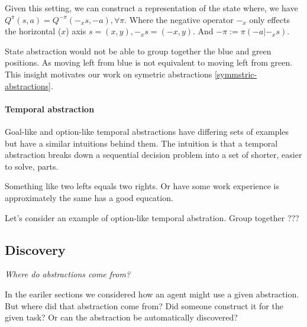 Given this setting, we can construct a representation of the state \footnotemark[11] where,
we have $Q^{\pi}(s, a) = Q^{-\pi}(-_xs, -a), \forall \pi$.
Where the negative operator $-_x$ only effects the horizontal ($x$) axis $s = (x, y), -_xs = (-x, y)$.
And $-\pi := \pi(-a|-_xs)$.


State abstraction would not be able to group together the blue and green positions.
As moving left from blue is not equivalent to moving left from green.
This insight motivates our work on symetric abstractions \ref{symmstric-abstractions}.

\paragraph{Temporal abstraction}

Goal-like and option-like temporal abstractions have differing sets of examples
but have a similar intuitions behind them. The intuition is that
a temporal abstraction breaks down a sequential decision problem into a set of
shorter, easier to solve, parts.

Something like two lefts equals two rights. Or have some work experience is approximately the same has a good equcation.

Let's consider an example of option-like temporal abstration. Group together ???


\subsection{Discovery}

\begin{displayquote}
  \textit{Where do abstractions come from?}
\end{displayquote}

In the eariler sections we considered how an agent might use a given abstraction.
But where did that abstraction come from? Did someone construct it for the given task?
Or can the abstraction be automatically discovered?




